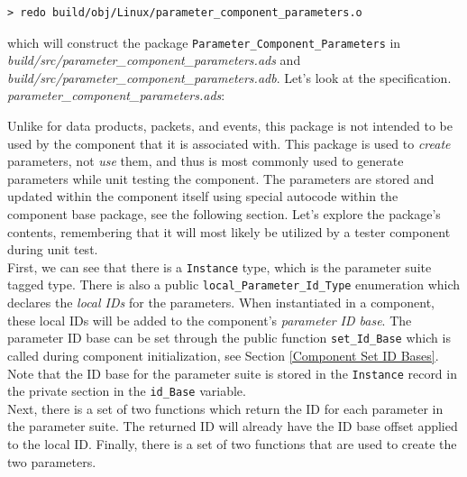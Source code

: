 \vspace{5mm} %
\begin{verbatim}
> redo build/obj/Linux/parameter_component_parameters.o
\end{verbatim}
\vspace{5mm} %

which will construct the package \texttt{Parameter\_Component\_Parameters} in \textit{build/src/parameter\_component\_parameters.ads} and \textit{build/src/parameter\_component\_parameters.adb}. Let's look at the specification. \\

\textit{parameter\_component\_parameters.ads}:

Unlike for data products, packets, and events, this package is not intended to be used by the component that it is associated with. This package is used to \textit{create} parameters, not \textit{use} them, and thus is most commonly used to generate parameters while unit testing the component. The parameters are stored and updated within the component itself using special autocode within the component base package, see the following section. Let's explore the package's contents, remembering that it will most likely be utilized by a tester component during unit test. \\

First, we can see that there is a \texttt{Instance} type, which is the parameter suite tagged type. There is also a public \texttt{local\_Parameter\_Id\_Type} enumeration which declares the \textit{local IDs} for the parameters. When instantiated in a component, these local IDs will be added to the component's \textit{parameter ID base}. The parameter ID base can be set through the public function \texttt{set\_Id\_Base} which is called during component initialization, see Section \ref{Component Set ID Bases}. Note that the ID base for the parameter suite is stored in the \texttt{Instance} record in the private section in the \texttt{id\_Base} variable. \\

Next, there is a set of two functions which return the ID for each parameter in the parameter suite. The returned ID will already have the ID base offset applied to the local ID. Finally, there is a set of two functions that are used to create the two parameters. \\

